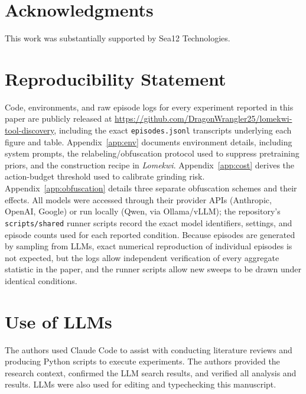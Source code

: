 \documentclass{article}
\begin{document}
\section{Acknowledgments}

This work was substantially supported by Sea12 Technologies. 

\section{Reproducibility Statement}
\label{sec:reproducibility}

Code, environments, and raw episode logs for every experiment reported in this paper are publicly released at \url{https://github.com/DragonWrangler25/lomekwi-tool-discovery}, including the exact \texttt{episodes.jsonl} transcripts underlying each figure and table. Appendix~\ref{app:env} documents environment details, including system prompts, the relabeling/obfuscation protocol used to suppress pretraining priors, and the construction recipe in \emph{Lomekwi}. Appendix~\ref{app:cost} derives the action-budget threshold used to calibrate grinding risk. Appendix~\ref{app:obfuscation} details three separate obfuscation schemes and their effects. All models were accessed through their provider APIs (Anthropic, OpenAI, Google) or run locally (Qwen, via Ollama/vLLM); the repository's \texttt{scripts/shared} runner scripts record the exact model identifiers, settings, and episode counts used for each reported condition. Because episodes are generated by sampling from LLMs, exact numerical reproduction of individual episodes is not expected, but the logs allow independent verification of every aggregate statistic in the paper, and the runner scripts allow new sweeps to be drawn under identical conditions.

\section{Use of LLMs}

The authors used Claude Code to assist with conducting literature reviews and producing Python scripts to execute experiments. The
authors provided the research context, confirmed the LLM search results, and verified all analysis and results. LLMs were also used for editing and typechecking this manuscript.



\newpage

\appendix
\end{document}
